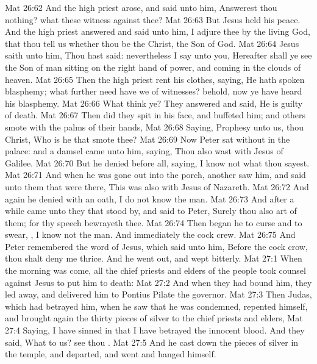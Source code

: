 \vs Mat 26:62 And the high priest arose, and said unto him, Answerest thou nothing? what  these witness against thee?
\vs Mat 26:63 But Jesus held his peace. And the high priest answered and said unto him, I adjure thee by the living God, that thou tell us whether thou be the Christ, the Son of God.
\vs Mat 26:64 Jesus saith unto him, Thou hast said: nevertheless I say unto you, Hereafter shall ye see the Son of man sitting on the right hand of power, and coming in the clouds of heaven.
\vs Mat 26:65 Then the high priest rent his clothes, saying, He hath spoken blasphemy; what further need have we of witnesses? behold, now ye have heard his blasphemy.
\vs Mat 26:66 What think ye? They answered and said, He is guilty of death.
\vs Mat 26:67 Then did they spit in his face, and buffeted him; and others smote  with the palms of their hands,
\vs Mat 26:68 Saying, Prophesy unto us, thou Christ, Who is he that smote thee?
\vs Mat 26:69 Now Peter sat without in the palace: and a damsel came unto him, saying, Thou also wast with Jesus of Galilee.
\vs Mat 26:70 But he denied before  all, saying, I know not what thou sayest.
\vs Mat 26:71 And when he was gone out into the porch, another  saw him, and said unto them that were there, This  was also with Jesus of Nazareth.
\vs Mat 26:72 And again he denied with an oath, I do not know the man.
\vs Mat 26:73 And after a while came unto  they that stood by, and said to Peter, Surely thou also art  of them; for thy speech bewrayeth thee.
\vs Mat 26:74 Then began he to curse and to swear, , I know not the man. And immediately the cock crew.
\vs Mat 26:75 And Peter remembered the word of Jesus, which said unto him, Before the cock crow, thou shalt deny me thrice. And he went out, and wept bitterly.
\vs Mat 27:1 When the morning was come, all the chief priests and elders of the people took counsel against Jesus to put him to death:
\vs Mat 27:2 And when they had bound him, they led  away, and delivered him to Pontius Pilate the governor.
\vs Mat 27:3 Then Judas, which had betrayed him, when he saw that he was condemned, repented himself, and brought again the thirty pieces of silver to the chief priests and elders,
\vs Mat 27:4 Saying, I have sinned in that I have betrayed the innocent blood. And they said, What  to us? see thou .
\vs Mat 27:5 And he cast down the pieces of silver in the temple, and departed, and went and hanged himself.
